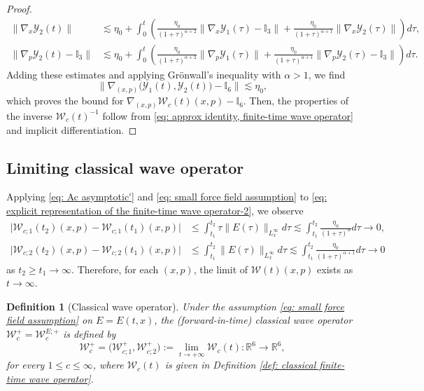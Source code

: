 \documentclass[reqno, 11pt, letterpaper]{amsart}
\newtheorem{definition}[theorem]{Definition}
\theoremstyle{remark}
\numberwithin{equation}{section}
\numberwithin{theorem}{section}
\numberwithin{table}{section}
\numberwithin{figure}{section}
\begin{document}
\begin{proof}
$$\begin{aligned}
\|\nabla_x\mathcal{Y}_2(t)\|&\lesssim\eta_0+\int_0^t \left ( \frac{\eta_0}{(1+\tau)^{\alpha+2}}\|\nabla_x\mathcal{Y}_1(\tau)-\mathbb{I}_3\|+\frac{\eta_0}{(1+\tau)^{\alpha+1}}\|\nabla_x\mathcal{Y}_2(\tau)\| \right ) d\tau,\\
\|\nabla_p\mathcal{Y}_2(t)-\mathbb{I}_3\|&\lesssim\eta_0+\int_0^t  \left ( \frac{\eta_0}{(1+\tau)^{\alpha+2}}\|\nabla_p\mathcal{Y}_1(\tau)\|+\frac{\eta_0}{(1+\tau)^{\alpha+1}}\|\nabla_p\mathcal{Y}_2(\tau)-\mathbb{I}_3\| \right ) d\tau.
\end{aligned}$$
Adding these estimates and applying Gr\"onwall's inequality with $\alpha > 1$, we find 
$$\Big\|\nabla_{(x,p)}\Big(\mathcal{Y}_1(t),\mathcal{Y}_2(t)\Big)-\mathbb{I}_6\Big\|\lesssim\eta_0,$$ 
which proves the bound for $\nabla_{(x,p)}\mathcal{W}_c(t)(x,p)-\mathbb{I}_6$. Then, the properties of the inverse $\mathcal{W}_c(t)^{-1}$ follow from \eqref{eq: approx identity, finite-time wave operator} and implicit differentiation. 
\end{proof}

\subsection{Limiting classical wave operator}\label{sec: Limiting classical wave operator}

Applying \eqref{eq: Ac asymptotic'} and \eqref{eq: small force field assumption} to \eqref{eq: explicit representation of the finite-time wave operator-2}, we observe
$$\begin{aligned}
\big|\mathcal{W}_{c;1}(t_2)(x,p)-\mathcal{W}_{c;1}(t_1)(x,p)\big|&\leq \int_{t_1}^{t_2} \tau \|E(\tau)\|_{L_x^\infty} d\tau\lesssim \int_{t_1}^{t_2} \frac{\eta_0}{(1+\tau)^\alpha} d\tau\to 0,\\
\big|\mathcal{W}_{c;2}(t_2)(x,p)-\mathcal{W}_{c;2}(t_1)(x,p)\big|&\leq \int_{t_1}^{t_2} \|E(\tau)\|_{L_x^\infty} d\tau\lesssim \int_{t_1}^{t_2} \frac{\eta_0}{(1+\tau)^{\alpha+1}} d\tau\to 0
\end{aligned}$$
as $t_2\geq t_1\to\infty$. Therefore, for each $(x,p)$, the limit of $\mathcal{W}(t)(x,p)$ exists as $t\to\infty$. 

\begin{definition}[Classical wave operator]
Under the assumption \eqref{eq: small force field assumption}  on $E=E(t,x)$, the  (forward-in-time) \textit{classical wave operator} $\mathcal{W}_c^+=\mathcal{W}_c^{E; +}$ is defined by 
\begin{equation}\label{eq: classical wave operator 1}
\mathcal{W}_c^+=\big(\mathcal{W}_{c;1}^+, \mathcal{W}_{c;2}^+\big):=\lim_{t\to+\infty}\mathcal{W}_c(t):\mathbb{R}^6\to\mathbb{R}^6,
\end{equation}
for every $1 \leq c \leq \infty$, where $\mathcal{W}_c(t)$ is given in Definition \ref{def: classical finite-time wave operator}. 
\end{definition}
\end{document}
